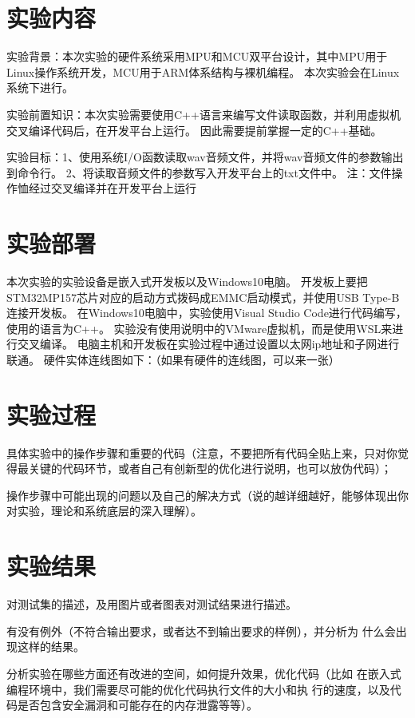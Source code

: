 \section{实验内容}

实验背景：本次实验的硬件系统采用MPU和MCU双平台设计，其中MPU用于Linux操作系统开发，MCU用于ARM体系结构与裸机编程。
本次实验会在Linux系统下进行。

实验前置知识：本次实验需要使用C++语言来编写文件读取函数，并利用虚拟机交叉编译代码后，在开发平台上运行。
因此需要提前掌握一定的C++基础。

实验目标：1、使用系统I/O函数读取wav音频文件，并将wav音频文件的参数输出到命令行。
2、将读取音频文件的参数写入开发平台上的txt文件中。
注：文件操作恤经过交叉编译并在开发平台上运行

\section{实验部署}

本次实验的实验设备是嵌入式开发板以及Windows10电脑。
开发板上要把STM32MP157芯片对应的启动方式拨码成EMMC启动模式，并使用USB Type-B连接开发板。
在Windows10电脑中，实验使用Visual Studio Code进行代码编写，使用的语言为C++。
实验没有使用说明中的VMware虚拟机，而是使用WSL来进行交叉编译。
电脑主机和开发板在实验过程中通过设置以太网ip地址和子网进行联通。
硬件实体连线图如下：（如果有硬件的连线图，可以来一张）

\section{实验过程}

具体实验中的操作步骤和重要的代码（注意，不要把所有代码全贴上来，只对你觉得最关键的代码环节，或者自己有创新型的优化进行说明，也可以放伪代码）；

操作步骤中可能出现的问题以及自己的解决方式（说的越详细越好，能够体现出你对实验，理论和系统底层的深入理解）。


\section{实验结果}

对测试集的描述，及用图片或者图表对测试结果进行描述。

有没有例外（不符合输出要求，或者达不到输出要求的样例），并分析为
什么会出现这样的结果。

分析实验在哪些方面还有改进的空间，如何提升效果，优化代码（比如
在嵌入式编程环境中，我们需要尽可能的优化代码执行文件的大小和执
行的速度，以及代码是否包含安全漏洞和可能存在的内存泄露等等）。


